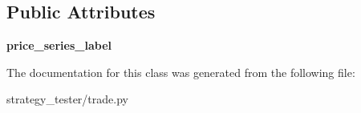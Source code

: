 \subsection*{\-Public \-Attributes}
\begin{DoxyCompactItemize}
\item 
\hypertarget{classstrategy__tester_1_1trade_1_1TradeEquity_a49650c2d0a8b9b74b860f764d029b992}{{\bfseries price\-\_\-series\-\_\-label}}\label{classstrategy__tester_1_1trade_1_1TradeEquity_a49650c2d0a8b9b74b860f764d029b992}

\end{DoxyCompactItemize}


\-The documentation for this class was generated from the following file\-:\begin{DoxyCompactItemize}
\item 
strategy\-\_\-tester/trade.\-py\end{DoxyCompactItemize}
